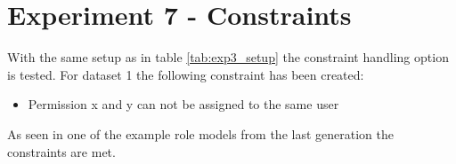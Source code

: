 \newpage
\section{Experiment 7 - Constraints}
\label{sec:exp7}
With the same setup as in table \ref{tab:exp3_setup} the constraint handling option is tested. For dataset 1 the following constraint has been created:

\begin{itemize}
    \item Permission x and y can not be assigned to the same user
\end{itemize}

As seen in one of the example role models from the last generation the constraints are met.

